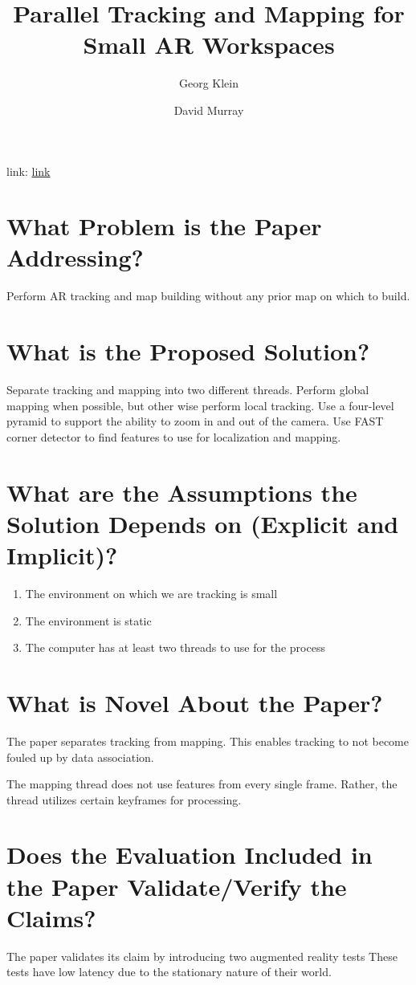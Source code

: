 \documentclass{article}
\title{Parallel Tracking and Mapping for Small AR Workspaces}
\author{
    Georg Klein \and
    David Murray
}
\begin{document}
\maketitle

link: \href{https://ieeexplore.ieee.org/stamp/stamp.jsp?arnumber=4538852}{link} 

\section{What Problem is the Paper Addressing?}
Perform AR tracking and map building without any prior map on which to build.

\section{What is the Proposed Solution?}
Separate tracking and mapping into two different threads.
Perform global mapping when possible, but other wise perform local tracking.
Use a four-level pyramid to support the ability to zoom in and out of the camera.
Use FAST corner detector to find features to use for localization and mapping.

\section{What are the Assumptions the Solution Depends on (Explicit and Implicit)?}
\begin{enumerate}
    \item The environment on which we are tracking is small
    \item The environment is static
    \item The computer has at least two threads to use for the process
\end{enumerate}

\section{What is Novel About the Paper?}
The paper separates tracking from mapping. This enables tracking to not 
become fouled up by data association.

The mapping thread does not use features from every single frame. Rather,
the thread utilizes certain keyframes for processing.

\section{Does the Evaluation Included in the Paper Validate/Verify the Claims?}
The paper validates its claim by introducing two augmented reality tests
These tests have low latency due to the stationary nature of their world.
\end{document}
